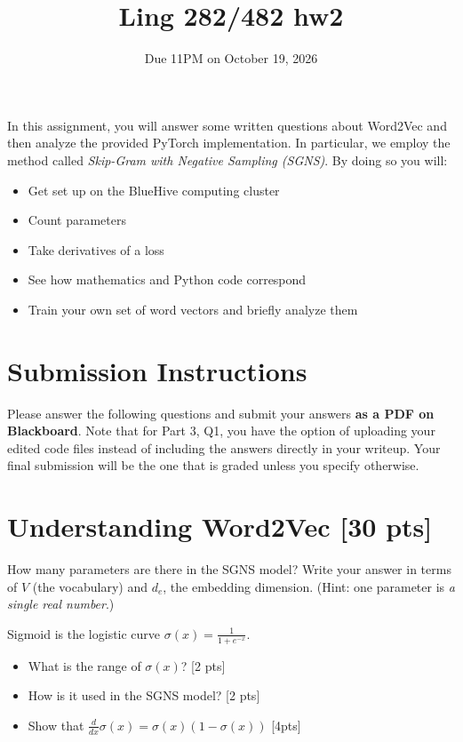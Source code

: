 \documentclass[11pt]{article}
\begin{document}
\title{Ling 282/482 hw2}
\date{\vspace{-0.2in}Due 11PM on October 19, 2026}
\maketitle


In this assignment, you will answer some written questions about Word2Vec and then analyze the provided PyTorch implementation. In particular, we employ  the method called \emph{Skip-Gram with Negative Sampling (SGNS)}. By doing so you will:
\begin{itemize}
  \item Get set up on the BlueHive computing cluster
  \item Count parameters
  \item Take derivatives of a loss
  \item See how mathematics and Python code correspond
  \item Train your own set of word vectors and briefly analyze them
\end{itemize}

\section*{Submission Instructions}
\noindent Please answer the following questions and submit your answers \textbf{as a PDF on Blackboard}. Note that for Part 3, Q1, you have the option of uploading your edited code files instead of including the answers directly in your writeup. Your final submission will be the one that is graded unless you specify otherwise.


\section{Understanding Word2Vec [30 pts]}

  How many parameters are there in the SGNS model?  Write your answer in terms of $V$ (the vocabulary) and $d_e$, the embedding dimension.  (Hint: one parameter is \emph{a single real number}.)

\vspace{2em}
  Sigmoid is the logistic curve $\sigma(x) = \frac{1}{1+e^{-x}}$.
\begin{itemize}
  \item What is the range of $\sigma(x)$? [2 pts]
  \item How is it used in the SGNS model? [2 pts]
  \item Show that $\frac{d}{dx}\sigma(x) = \sigma(x)(1-\sigma(x))$ [4pts]
\end{itemize}
\end{document}
